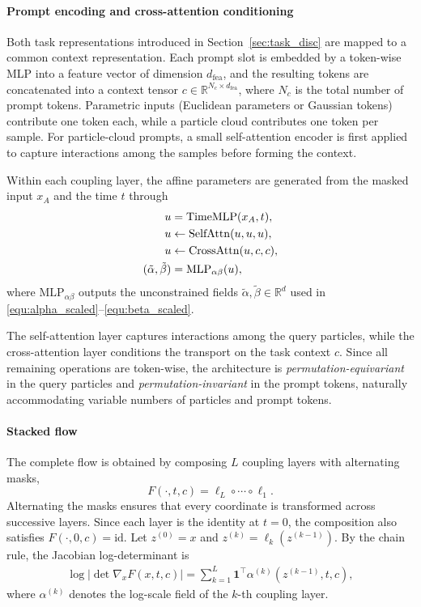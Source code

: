 \documentclass[preprint]{elsarticle}
\newcommand{\R}{\mathbb{R}}
\begin{document}
\paragraph{Prompt encoding and cross-attention conditioning}
Both task representations introduced in Section~\ref{sec:task_disc} are mapped to a common context representation. Each prompt slot is embedded by a token-wise MLP into a feature vector of dimension $d_{\mathrm{fea}}$, and the resulting tokens are concatenated into a context tensor $c\in\R^{N_c\times d_{\mathrm{fea}}}$, where $N_c$ is the total number of prompt tokens. Parametric inputs (Euclidean parameters or Gaussian tokens) contribute one token each, while a particle cloud contributes one token per sample. For particle-cloud prompts, a small self-attention encoder is first applied to capture interactions among the samples before forming the context.

Within each coupling layer, the affine parameters are generated from the masked input $x_A$ and the time $t$ through
\begin{align}
u &= \mathrm{TimeMLP}(x_A,t),\notag\\
u &\leftarrow \mathrm{SelfAttn}(u,u,u),\notag\\
u &\leftarrow \mathrm{CrossAttn}(u,c,c),\notag\\
(\tilde\alpha,\tilde\beta) &= \mathrm{MLP}_{\alpha\beta}(u),
\label{equ:layer_net}
\end{align}
where $\mathrm{MLP}_{\alpha\beta}$ outputs the unconstrained fields $\tilde\alpha,\tilde\beta\in\R^d$ used in
\eqref{equ:alpha_scaled}--\eqref{equ:beta_scaled}.

The self-attention layer captures interactions among the query particles, while the cross-attention layer conditions the transport on the task context $c$. Since all remaining operations are token-wise, the architecture is \emph{permutation-equivariant} in the query particles and \emph{permutation-invariant} in the prompt tokens, naturally accommodating variable numbers of particles and prompt tokens.

\paragraph{Stacked flow}
The complete flow is obtained by composing $L$ coupling layers with alternating masks,
\[
F(\cdot,t,c)=\ell_L\circ\cdots\circ\ell_1.
\]
Alternating the masks ensures that every coordinate is transformed across successive layers. Since each layer is the identity at $t=0$, the composition also satisfies $F(\cdot,0,c)=\mathrm{id}$. Let $z^{(0)}=x$ and $z^{(k)}=\ell_k(z^{(k-1)})$. By the chain rule, the Jacobian log-determinant is
\begin{align}
\log\bigl|\det\nabla_xF(x,t,c)\bigr|
=
\sum_{k=1}^{L}
\mathbf1^\top
\alpha^{(k)}\!\left(z^{(k-1)},t,c\right),
\label{equ:stack_logdet}
\end{align}
where $\alpha^{(k)}$ denotes the log-scale field of the $k$-th coupling layer.
\end{document}
